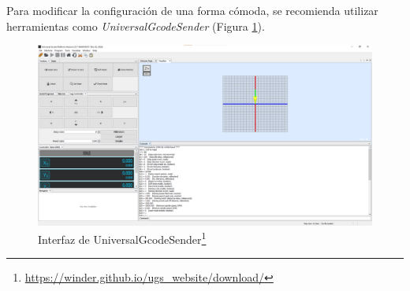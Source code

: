 Para modificar la configuración de una forma cómoda, se recomienda utilizar herramientas como 
\textit{UniversalGcodeSender} (Figura \ref{fig:ugs}).

\begin{figure} [ht!]
\begin{center}
    \includegraphics[width=15cm]{figs/ugs.png}
\end{center}
\caption{Interfaz de UniversalGcodeSender\footnote{\url{https://winder.github.io/ugs_website/download/}}}
\label{fig:ugs}
\end{figure}

